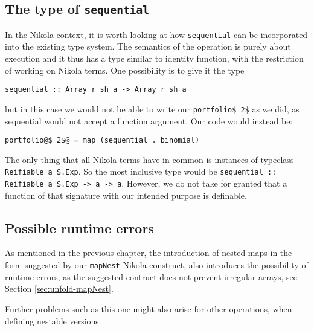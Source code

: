 \subsection{The type of \texttt{sequential}}
In the Nikola context, it is worth looking at how
\lstinline{sequential} can be incorporated into the existing type
system. The semantics of the operation is purely about execution and
it thus has a type similar to identity function, with the restriction
of working on Nikola terms. One possibility is to give it the type
\begin{lstlisting}
sequential :: Array r sh a -> Array r sh a
\end{lstlisting}
but in this case we would not be able to write our
\lstinline[mathescape]{portfolio$_2$} as we did, as sequential would
not accept a function argument. Our code would instead be:
\begin{lstlisting}
portfolio@$_2$@ = map (sequential . binomial)
\end{lstlisting}
The only thing that all Nikola terms have in common is instances of typeclass
\lstinline{Reifiable a S.Exp}. So the most inclusive type would be
\lstinline{sequential :: Reifiable a S.Exp -> a -> a}. However, we do not take
for granted that a function of that signature with our intended purpose is
definable.


\subsection{Possible runtime errors}

As mentioned in the previous chapter, the introduction of nested maps
in the form suggested by our \lstinline{mapNest} Nikola-construct,
also introduces the possibility of runtime errors, as the suggested
contruct does not prevent irregular arrays, see Section \ref{sec:unfold-mapNest}.

Further problems such as this one might also arise for other
operations, when defining nestable versions.

